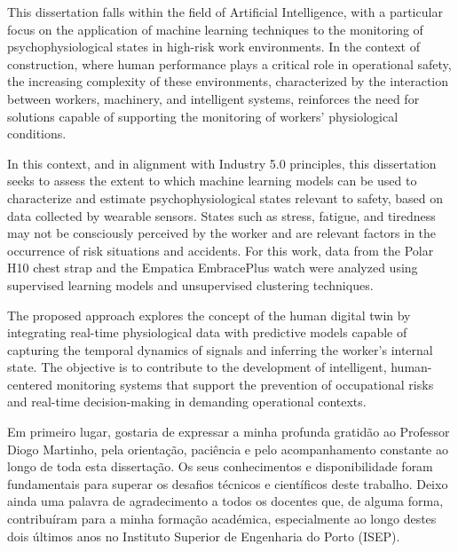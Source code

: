 {{\begin{abstractotherlanguage}
This dissertation falls within the field of Artificial Intelligence, with a particular focus on the application of machine learning techniques to the monitoring of psychophysiological states in high-risk work environments. In the context of construction, where human performance plays a critical role in operational safety, the increasing complexity of these environments, characterized by the interaction between workers, machinery, and intelligent systems, reinforces the need for solutions capable of supporting the monitoring of workers’ physiological conditions.

In this context, and in alignment with Industry 5.0 principles, this dissertation seeks to assess the extent to which machine learning models can be used to characterize and estimate psychophysiological states relevant to safety, based on data collected by wearable sensors. States such as stress, fatigue, and tiredness may not be consciously perceived by the worker and are relevant factors in the occurrence of risk situations and accidents. For this work, data from the Polar H10 chest strap and the Empatica EmbracePlus watch were analyzed using supervised learning models and unsupervised clustering techniques.

The proposed approach explores the concept of the human digital twin by integrating real-time physiological data with predictive models capable of capturing the temporal dynamics of signals and inferring the worker's internal state. The objective is to contribute to the development of intelligent, human-centered monitoring systems that support the prevention of occupational risks and real-time decision-making in demanding operational contexts.

\end{abstractotherlanguage}
}%


\begin{acknowledgements}
Em primeiro lugar, gostaria de expressar a minha profunda gratidão ao Professor Diogo Martinho, pela orientação, paciência e pelo acompanhamento constante ao longo de toda esta dissertação. Os seus conhecimentos e disponibilidade foram fundamentais para superar os desafios técnicos e científicos deste trabalho. Deixo ainda uma palavra de agradecimento a todos os docentes que, de alguma forma, contribuíram para a minha formação académica, especialmente ao longo destes dois últimos anos no Instituto Superior de Engenharia do Porto (ISEP).


\end{acknowledgements}}
